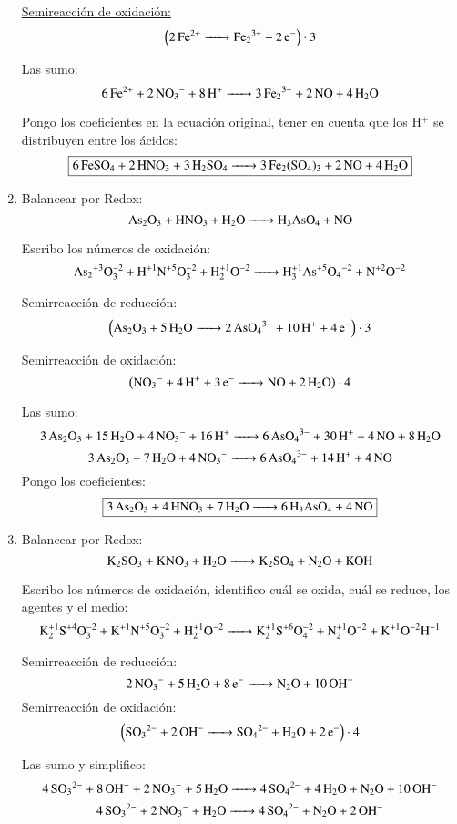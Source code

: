 \begin{enumerate}
\begin{multicols}{2}
\underline{Semireacción de oxidación:}
$$\left(\ce{ 2Fe^{2+} -> Fe_2^{3+} + 2e^-}  \right)\cdot 3$$
\end{multicols}

Las sumo:
$$
\ce{6Fe^{2+} + 2NO_3^- + 8H^+ -> 3Fe_2^{3+} + 2NO + 4H_2O}
$$

Pongo los coeficientes en la ecuación original, tener en cuenta que los H$^+$ se distribuyen entre los ácidos:
$$\fbox{\ce{6FeSO_4 + 2HNO_3 + 3H_2SO_4 -> 3Fe_2(SO4)3 + 2NO + 4H2O}}$$


\item Balancear por Redox:
$$\ce{
As2O3 + HNO3 + H2O -> H3AsO4 + NO
}$$

Escribo los números de oxidación:
$$\ce{
As2^{+3}O^{-2}3 + H^{+1}N^{+5}O^{-2}3 + H^{+1}2O^{-2} -> H^{+1}3As^{+5}O4^{-2} + N^{+2}O^{-2}
}$$


\begin{multicols}{2}
Semirreacción de reducción:
$$\left(\ce{
As2O3 + 5H2O -> 2AsO4^{3-} + 10H^+ +4e^-
}\right)\cdot 3$$

Semirreacción de oxidación:
$$\left(\ce{
NO_3^{-} + 4H^+ +3e^- -> NO + 2H2O
}\right)\cdot 4$$
\end{multicols}

Las sumo:
$$\ce{
3As2O3 + 15H2O + 4NO3^- + 16H^+ -> 6AsO_4^{3-} + 30H^+ + 4NO + 8 H2O
}$$
$$\ce{
3As2O3 + 7H2O + 4NO3^- -> 6AsO_4^{3-} + 14H^+ + 4NO
}$$
Pongo los coeficientes:
$$\fbox{\ce{
3As2O3 + 4HNO3 + 7H2O -> 6H3AsO4 + 4NO}}$$


\newpage
\item
Balancear por Redox:
$$\ce{K2SO3 + KNO3 + H2O ->
K2SO4 + N2O + KOH}$$

Escribo los números de oxidación, identifico cuál se oxida, cuál se reduce, los agentes y el medio:
$$\ce{
K^{+1}2S^{+4}O^{-2}3 + K^{+1}N^{+5}O^{-2}3 + H^{+1}2O^{-2} ->
K^{+1}2S^{+6}O^{-2}4 + N^{+1}2O^{-2} + K^{+1}O^{-2}H^{-1}
}$$


\begin{multicols}{2}
Semirreacción de reducción:
$$\ce{
2NO_3^{-} + 5 H2O + 8e^- ->
N2O + 10OH^-
}$$
Semirreacción de oxidación:
$$\left(\ce{
SO3^{2-} + 2OH^- ->
SO4^{2-} + H2O + 2e^-
}\right)\cdot 4$$
\end{multicols}

Las sumo y simplifico:
$$\ce{
4SO3^{2-} + 8OH^- + 2NO_3^- + 5H2O ->
4SO_4^{2-} + 4 H2O + N2O + 10OH^-
}$$
$$\ce{
4SO3^{2-} + 2NO_3^- + H2O ->
4SO_4^{2-} + N2O + 2OH^-
}$$


\end{enumerate}
